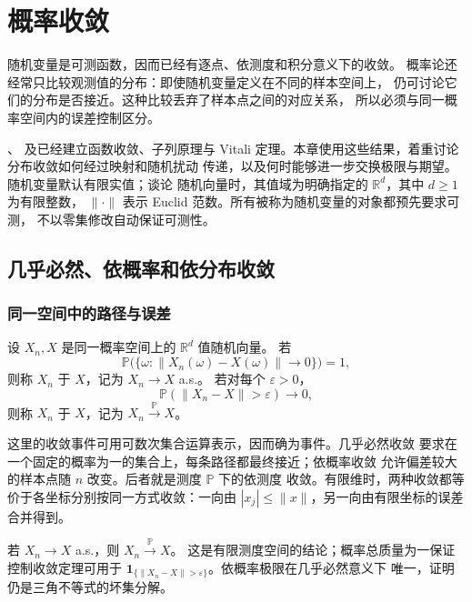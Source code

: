 \chapter{概率收敛}
\label{chap:probability-convergence}

随机变量是可测函数，因而已经有逐点、依测度和积分意义下的收敛。
概率论还经常只比较观测值的分布：即使随机变量定义在不同的样本空间上，
仍可讨论它们的分布是否接近。这种比较丢弃了样本点之间的对应关系，
所以必须与同一概率空间内的误差控制区分。

、
及已经建立函数收敛、子列原理与
Vitali 定理。本章使用这些结果，着重讨论分布收敛如何经过映射和随机扰动
传递，以及何时能够进一步交换极限与期望。随机变量默认有限实值；谈论
随机向量时，其值域为明确指定的 $\mathbb R^d$，其中 $d\ge1$ 为有限整数，
$\|\cdot\|$ 表示 Euclid 范数。所有被称为随机变量的对象都预先要求可测，
不以零集修改自动保证可测性。

\section{几乎必然、依概率和依分布收敛}
\label{sec:probability-convergence-definitions}

\subsection{同一空间中的路径与误差}

\begin{definition}
\label{def:almost-sure-probability-convergence}
设 $X_n,X$ 是同一概率空间上的 $\mathbb R^d$ 值随机向量。
若
\[
 \mathbb P\bigl(\{\omega:\|X_n(\omega)-X(\omega)\|\to0\}\bigr)=1,
\]
则称 $X_n$ 于 $X$，记为 $X_n\to X$ a.s.。
若对每个 $\varepsilon>0$，
\[
 \mathbb P(\|X_n-X\|>\varepsilon)\longrightarrow0,
\]
则称 $X_n$ 于 $X$，记为
$X_n\xrightarrow{\mathbb P}X$。
\end{definition}

这里的收敛事件可用可数次集合运算表示，因而确为事件。几乎必然收敛
要求在一个固定的概率为一的集合上，每条路径都最终接近；依概率收敛
允许偏差较大的样本点随 $n$ 改变。后者就是测度 $\mathbb P$ 下的依测度
收敛。有限维时，两种收敛都等价于各坐标分别按同一方式收敛：一向由
$|x_j|\le\|x\|$，另一向由有限坐标的误差合并得到。

若 $X_n\to X$ a.s.，则 $X_n\xrightarrow{\mathbb P}X$。
这是有限测度空间的结论；概率总质量为一保证控制收敛定理可用于
$\mathbf1_{\{\|X_n-X\|>\varepsilon\}}$。依概率极限在几乎必然意义下
唯一，证明仍是三角不等式的坏集分解。

